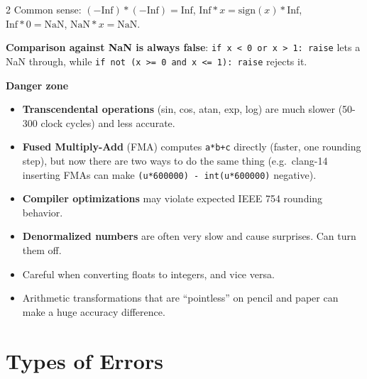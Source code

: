 \documentclass[a4paper,9pt]{extarticle}
\begin{document}
\begin{multicols}{2}
Common sense: $(-\text{Inf}) * (-\text{Inf}) = \text{Inf}$,
$\text{Inf} * x = \text{sign}(x) * \text{Inf}$, $\text{Inf} * 0 = \text{NaN}$,
$\text{NaN} * x = \text{NaN}$.


\begin{warning}

\textbf{Comparison against NaN is always false}: \texttt{if x < 0 or x > 1: raise} lets a NaN
through, while \texttt{if not (x >= 0 and x <= 1): raise} rejects it.

\end{warning}


\begin{warning}

\textbf{Danger zone}

\begin{itemize}

\item \textbf{Transcendental operations} (sin, cos, atan, exp, log) are much slower (50-300
clock cycles) and less accurate.

\item \textbf{Fused Multiply-Add} (FMA) computes \texttt{a*b+c} directly (faster, one rounding
step), but now there are two ways to do the same thing (e.g.\ clang-14 inserting FMAs can make
\texttt{(u*600000) - int(u*600000)} negative).

\item \textbf{Compiler optimizations} may violate expected IEEE 754 rounding behavior.

\item \textbf{Denormalized numbers} are often very slow and cause surprises. Can turn them off.

\item Careful when converting floats to integers, and vice versa.

\item Arithmetic transformations that are ``pointless'' on pencil and paper can make a huge
accuracy difference.

\end{itemize}

\end{warning}



\section{Types of Errors}


\begin{example}


\end{example}
\end{multicols}
\end{document}
